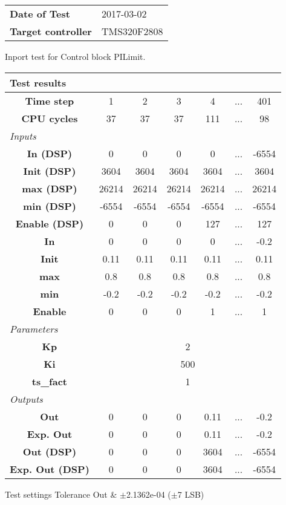 \begin{tabular}{l l}
\textbf{Date of Test} & 2017-03-02 \tabularnewline
\textbf{Target controller} & TMS320F2808 \tabularnewline
\end{tabular}
\vspace{1ex}
Inport test for Control block PILimit.

\vspace{1em}
\begin{tabularx}{\textwidth}{|c|c|c|c|c|>{\centering\arraybackslash}X|c|}
\hline
\multicolumn{7}{|l|}{\cellcolor[gray]{0.8}\textbf{Test results}} \tabularnewline \hline
\textbf{Time step} & 1 & 2 & 3 & 4 & ... & 401 \tabularnewline \hline
\textbf{CPU cycles} & 37 & 37 & 37 & 111 & ... & 98 \tabularnewline \hline
\multicolumn{7}{|l|}{\cellcolor[gray]{0.9}\textit{Inputs}} \tabularnewline \hline
\textbf{In (DSP)} & 0 & 0 & 0 & 0 & ... & -6554 \tabularnewline \hline
\textbf{Init (DSP)} & 3604 & 3604 & 3604 & 3604 & ... & 3604 \tabularnewline \hline
\textbf{max (DSP)} & 26214 & 26214 & 26214 & 26214 & ... & 26214 \tabularnewline \hline
\textbf{min (DSP)} & -6554 & -6554 & -6554 & -6554 & ... & -6554 \tabularnewline \hline
\textbf{Enable (DSP)} & 0 & 0 & 0 & 127 & ... & 127 \tabularnewline \hline
\textbf{In} & 0 & 0 & 0 & 0 & ... & -0.2 \tabularnewline \hline
\textbf{Init} & 0.11 & 0.11 & 0.11 & 0.11 & ... & 0.11 \tabularnewline \hline
\textbf{max} & 0.8 & 0.8 & 0.8 & 0.8 & ... & 0.8 \tabularnewline \hline
\textbf{min} & -0.2 & -0.2 & -0.2 & -0.2 & ... & -0.2 \tabularnewline \hline
\textbf{Enable} & 0 & 0 & 0 & 1 & ... & 1 \tabularnewline \hline
\multicolumn{7}{|l|}{\cellcolor[gray]{0.9}\textit{Parameters}} \tabularnewline \hline
\textbf{Kp} & \multicolumn{6}{c|}{2} \tabularnewline \hline
\textbf{Ki} & \multicolumn{6}{c|}{500} \tabularnewline \hline
\textbf{ts\_fact} & \multicolumn{6}{c|}{1} \tabularnewline \hline
\multicolumn{7}{|l|}{\cellcolor[gray]{0.9}\textit{Outputs}} \tabularnewline \hline
\textbf{Out} & 0 & 0 & 0 & 0.11 & ... & -0.2 \tabularnewline \hline
\textbf{Exp. Out} & 0 & 0 & 0 & 0.11 & ... & -0.2 \tabularnewline \hline
\textbf{Out (DSP)} & 0 & 0 & 0 & 3604 & ... & -6554 \tabularnewline \hline
\textbf{Exp. Out (DSP)} & 0 & 0 & 0 & 3604 & ... & -6554 \tabularnewline \hline
\end{tabularx}
\vspace{1ex}

\begin{XtoCtabular}{Test settings}
Tolerance Out & $\pm$2.1362e-04 ($\pm$7 LSB) \tabularnewline \hline
\end{XtoCtabular}

